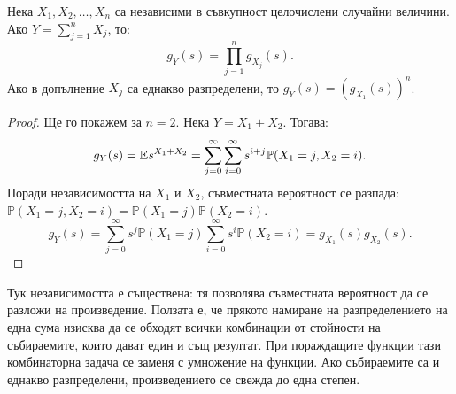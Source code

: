\begin{prop}
Нека $X_1, X_2, \dots, X_n$ са независими в съвкупност целочислени случайни величини. Ако $Y = \sum_{j=1}^n X_j$, то:
\[ g_Y(s) = \prod_{j=1}^n g_{X_j}(s). \]
Ако в допълнение $X_j$ са еднакво разпределени, то $g_Y(s) = (g_{X_1}(s))^n$.
\end{prop}

\begin{proof}
Ще го покажем за $n=2$. Нека $Y = X_1 + X_2$. Тогава:
\[ g_Y(s) = \mathbb{E} s^{X_1+X_2} = \sum_{j=0}^{\infty} \sum_{i=0}^{\infty} s^{i+j} \mathbb{P}(X_1=j, X_2=i). \]
Поради независимостта на $X_1$ и $X_2$, съвместната вероятност се разпада: $\mathbb{P}(X_1=j, X_2=i) = \mathbb{P}(X_1=j)\mathbb{P}(X_2=i)$.
\[ g_Y(s) = \sum_{j=0}^{\infty} s^j \mathbb{P}(X_1=j) \sum_{i=0}^{\infty} s^i \mathbb{P}(X_2=i) = g_{X_1}(s) g_{X_2}(s). \]
\end{proof}

Тук независимостта е съществена: тя позволява съвместната вероятност да се разложи на произведение. Ползата е, че прякото намиране на разпределението на една сума изисква да се обходят всички комбинации от стойности на събираемите, които дават един и същ резултат. При пораждащите функции тази комбинаторна задача се заменя с умножение на функции. Ако събираемите са и еднакво разпределени, произведението се свежда до една степен.

